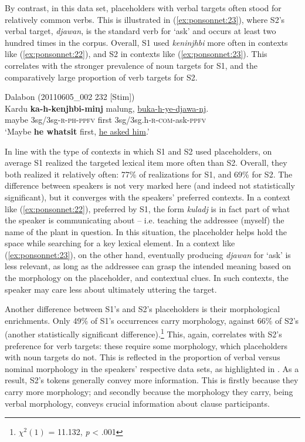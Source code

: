 \documentclass[output=paper]{langscibook}
\begin{document}
By contrast, in this data set, placeholders with verbal targets often stood for relatively common verbs. This is illustrated in (\ref{ex:ponsonnet:23}), where S2’s verbal target, \textit{djawan}, is the standard verb for ‘ask’ and occurs at least two hundred times in the corpus. Overall, S1 used \textit{keninjhbi} more often in contexts like (\ref{ex:ponsonnet:22}), and S2 in contexts like (\ref{ex:ponsonnet:23}). This correlates with the stronger prevalence of noun targets for S1, and the comparatively large proportion of verb targets for S2.

\ea
{\label{ex:ponsonnet:23}Dalabon (20110605\_002 232 [Stim])}\\
\gll Kardu   \textbf{ka-h-kenjhbi-minj}   malung, \uline{buka-h-ye-djawa-nj}.\\
\textup{maybe}   {3sg/3sg-}\textsc{r-ph}\textup{{}-}\textsc{ppfv} \textup{first} \textup{3sg/3sg.h-}\textsc{r}\textup{{}-}\textsc{com}\textup{{}-ask-}\textsc{ppfv}\\
\glt \textup{‘Maybe} \textbf{\textup{he} \textbf{whatsit}} \textup{first, \uline{he asked him}.’}
\z

In line with the type of contexts in which S1 and S2 used placeholders, on average S1 realized the targeted lexical item more often than S2. Overall, they both realized it relatively often: 77\% of realizations for S1, and 69\% for S2. The difference between speakers is not very marked here (and indeed not statistically significant), but it converges with the speakers’ preferred contexts. In a context like (\ref{ex:ponsonnet:22}), preferred by S1, the form \textit{kuladj} is in fact part of what the speaker is communicating about – i.e. teaching the addressee (myself) the name of the plant in question. In this situation, the placeholder helps hold the space while searching for a key lexical element. In a context like (\ref{ex:ponsonnet:23}), on the other hand, eventually producing \textit{djawan} for ‘ask’ is less relevant, as long as the addressee can grasp the intended meaning based on the morphology on the placeholder, and contextual clues. In such contexts, the speaker may care less about ultimately uttering the target. 

Another difference between S1’s and S2’s placeholders is their morphological enrichments. Only 49\% of S1’s occurrences carry morphology, against 66\% of S2’s (another statistically significant difference).\footnote{$\chi^2 (1)$ = 11.132, \textit{p} < .001} This, again, correlates with S2’s preference for verb targets: these require some morphology, which placeholders with noun targets do not. This is reflected in the proportion of verbal versus nominal morphology in the speakers’ respective data sets, as highlighted in . As a result, S2’s tokens generally convey more information. This is firstly because they carry more morphology; and secondly because the morphology they carry, being verbal morphology, conveys crucial information about clause participants. 
\end{document}
